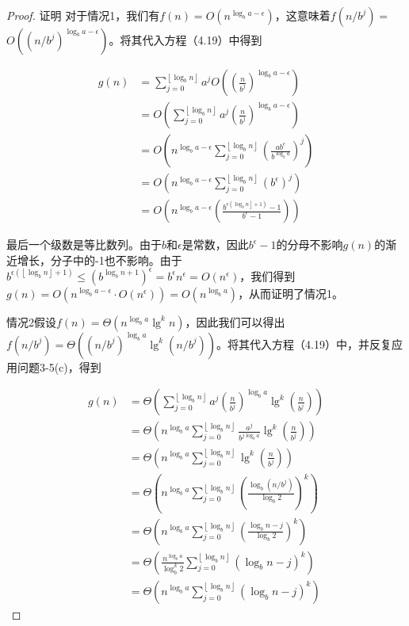 \documentclass[lang=cn,newtx,10pt,scheme=chinese]{elegantbook}
\begin{document}
\begin{proof}
证明 对于情况1，我们有$f(n)=O\left(n^{\log _b a-\epsilon}\right)$，这意味着$f\left(n / b^j\right)=$ $O\left(\left(n / b^j\right)^{\log _b a-\epsilon}\right)$。将其代入方程（4.19）中得到

$$
\begin{aligned}
g(n) & =\sum_{j=0}^{\left\lfloor\log _b n\right\rfloor} a^j O\left(\left(\frac{n}{b^j}\right)^{\log _b a-\epsilon}\right) \\
& =O\left(\sum_{j=0}^{\left\lfloor\log _b n\right\rfloor} a^j\left(\frac{n}{b^j}\right)^{\log _b a-\epsilon}\right) \\
& =O\left(n^{\log _b a-\epsilon} \sum_{j=0}^{\left\lfloor\log _b n\right\rfloor}\left(\frac{a b^\epsilon}{b^{\log _b a}}\right)^j\right) \\
& =O\left(n^{\log _b a-\epsilon} \sum_{j=0}^{\left\lfloor\log _b n\right\rfloor}\left(b^\epsilon\right)^j\right) \\
& =O\left(n^{\log _b a-\epsilon}\left(\frac{b^{\left.\epsilon\left(\log _b n\right\rfloor+1\right)}-1}{b^\epsilon-1}\right)\right)
\end{aligned}
$$

最后一个级数是等比数列。由于$b$和$\epsilon$是常数，因此$b^\epsilon-1$的分母不影响$g(n)$的渐近增长，分子中的-1也不影响。由于$b^{\epsilon\left(\left\lfloor\log _b n\right\rfloor+1\right)} \leq\left(b^{\log _b n+1}\right)^\epsilon=b^\epsilon n^\epsilon=O\left(n^\epsilon\right)$，我们得到$g(n)=O\left(n^{\log _b a-\epsilon} \cdot O\left(n^\epsilon\right)\right)=O\left(n^{\log _b a}\right)$，从而证明了情况1。

情况2假设$f(n)=\Theta\left(n^{\log _b a} \lg ^k n\right)$，因此我们可以得出$f\left(n / b^j\right)=\Theta\left(\left(n / b^j\right)^{\log _b a} \lg ^k\left(n / b^j\right)\right)$。将其代入方程（4.19）中，并反复应用问题3-5(c)，得到

$$
\begin{aligned}
g(n) & =\Theta\left(\sum_{j=0}^{\left\lfloor\log _b n\right\rfloor} a^j\left(\frac{n}{b^j}\right)^{\log _b a} \lg ^k\left(\frac{n}{b^j}\right)\right) \\
& =\Theta\left(n^{\log _b a} \sum_{j=0}^{\left\lfloor\log _b n\right\rfloor} \frac{a^j}{b^{j \log _b a}} \lg ^k\left(\frac{n}{b^j}\right)\right) \\
& =\Theta\left(n^{\log _b a} \sum_{j=0}^{\left\lfloor\log _b n\right\rfloor} \lg ^k\left(\frac{n}{b^j}\right)\right) \\
& =\Theta\left(n^{\log _b a} \sum_{j=0}^{\left\lfloor\log _b n\right\rfloor}\left(\frac{\log _b\left(n / b^j\right)}{\log _b 2}\right)^k\right) \\
& =\Theta\left(n^{\log _b a} \sum_{j=0}^{\left\lfloor\log _b n\right\rfloor}\left(\frac{\log _b n-j}{\log _b 2}\right)^k\right) \\
& =\Theta\left(\frac{n^{\log _b a}}{\log _b^k 2} \sum_{j=0}^{\left\lfloor\log _b n\right\rfloor}\left(\log _b n-j\right)^k\right) \\
& =\Theta\left(n^{\log _b a} \sum_{j=0}^{\left\lfloor\log _b n\right\rfloor}\left(\log _b n-j\right)^k\right)
\end{aligned}
$$


\end{proof}
\end{document}
